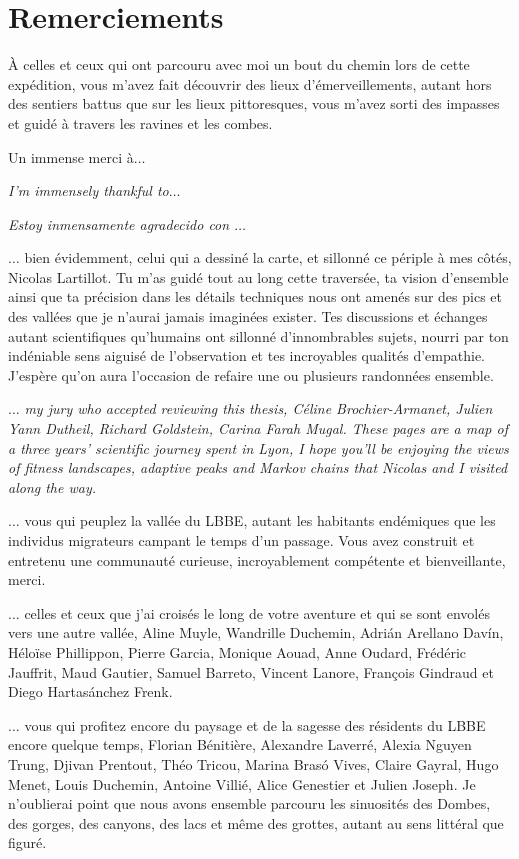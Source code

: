 \thispagestyle{empty}
\section*{Remerciements}

À celles et ceux qui ont parcouru avec moi un bout du chemin lors de cette expédition, vous m’avez fait découvrir des lieux d’émerveillements, autant hors des sentiers battus que sur les lieux pittoresques, vous m’avez sorti des impasses et guidé à travers les ravines et les combes.

Un immense merci à$\hdots$

\textit{I’m immensely thankful to$\hdots$}

\textit{Estoy inmensamente agradecido con $\hdots$}

$\hdots$ bien évidemment, celui qui a dessiné la carte, et sillonné ce périple à mes côtés, Nicolas Lartillot.
Tu m’as guidé tout au long cette traversée, ta vision d’ensemble ainsi que ta précision dans les détails techniques nous ont amenés sur des pics et des vallées que je n’aurai jamais imaginées exister.
Tes discussions et échanges autant scientifiques qu’humains ont sillonné d'innombrables sujets, nourri par ton indéniable sens aiguisé de l’observation et tes incroyables qualités d’empathie.
J’espère qu’on aura l’occasion de refaire une ou plusieurs randonnées ensemble.

$\hdots$ \textit{my jury who accepted reviewing this thesis, Céline Brochier-Armanet, Julien Yann Dutheil, Richard Goldstein, Carina Farah Mugal.
These pages are a map of a three years’ scientific journey spent in Lyon, I hope you’ll be enjoying the views of fitness landscapes, adaptive peaks and Markov chains that Nicolas and I visited along the way.}

$\hdots$ vous qui peuplez la vallée du LBBE, autant les habitants endémiques que les individus migrateurs campant le temps d’un passage.
Vous avez construit et entretenu une communauté curieuse, incroyablement compétente et bienveillante, merci.

$\hdots$ celles et ceux que j’ai croisés le long de votre aventure et qui se sont envolés vers une autre vallée, Aline Muyle, Wandrille Duchemin, Adrián Arellano Davín, Héloïse Phillippon, Pierre Garcia, Monique Aouad, Anne Oudard, Frédéric Jauffrit, Maud Gautier, Samuel Barreto, Vincent Lanore, François Gindraud et Diego Hartasánchez Frenk.

$\hdots$ vous qui profitez encore du paysage et de la sagesse des résidents du LBBE encore quelque temps, Florian Bénitière, Alexandre Laverré, Alexia Nguyen Trung, Djivan Prentout, Théo Tricou, Marina Brasó Vives, Claire Gayral, Hugo Menet, Louis Duchemin, Antoine Villié, Alice Genestier et Julien Joseph.
Je n’oublierai point que nous avons ensemble parcouru les sinuosités des Dombes, des gorges, des canyons, des lacs et même des grottes, autant au sens littéral que figuré.

